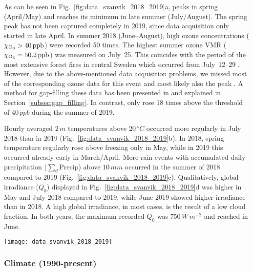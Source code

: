 \documentclass[bg, manuscript]{copernicus}
\begin{document}
As can be seen in Fig.~\ref{fig:data_svanvik_2018_2019}a,  peaks in spring (April/May) and reaches its minimum in late summer (July/August). The spring peak has not been captured completely in 2019, since data acquisition only started in late April. In summer 2018 (June--August), high ozone concentrations ($\chem{\chi_{O_3}} > 40\,\unit{ppb}$) were recorded 50 times. The highest summer ozone VMR ($\chem{\chi_{O_3}} = 50.2\,\unit{ppb}$) was measured on July~25. This coincides with the period of the most extensive forest fires in central Sweden which occurred from July~12--29 \citep{SOU2019}. However, due to the above-mentioned data acquisition problems, we missed most of the corresponding ozone data for this event and most likely also the peak . A method for gap-filling these data has been presented in \citet{ACP:Falk2021} and explained in Section~\ref{subsec:gap_filling}. In contrast,  only rose 18 times above the threshold of $40\,\unit{ppb}$ during the summer of 2019. 

Hourly averaged $2\,\unit{m}$ temperatures above $20\,\unit{^\circ C}$ occurred more regularly in July 2018 than in 2019 (Fig.~\ref{fig:data_svanvik_2018_2019}b). In 2018, spring temperature regularly rose above freezing only in May, while in 2019 this occurred already early in March/April.
More rain events with accumulated daily precipitation ($\sum_d \mathrm{Precip}$) above $10\,\unit{mm}$ occurred in the summer of 2018 compared to 2019 (Fig.~\ref{fig:data_svanvik_2018_2019}c).
Qualitatively, global irradiance ($Q_0$) displayed in Fig.~\ref{fig:data_svanvik_2018_2019}d was higher in May and July 2018 compared to 2019, while June 2019 showed higher irradiance than in 2018. A high global irradiance, in most cases, is the result of a low cloud fraction. In both years, the maximum recorded $Q_0$ was $750\,\unit{W\,m^{-2}}$ and reached in June.

\begin{figure*}[t]
  \texttt{[image: data\_svanvik\_2018\_2019]}
  \caption{Observational data from atmospheric monitoring at Svanhovd in 2018/19. The hatched areas indicate periods without ozone monitoring data. (a) Hourly averaged ozone VMR; (b) hourly averaged temperature; (c) daily accumulated precipitation; (d) hourly averaged global irradiance.}
  \label{fig:data_svanvik_2018_2019}
\end{figure*}


\subsubsection{Climate (1990-present)}
\label{subsec:climatologies}
\end{document}
